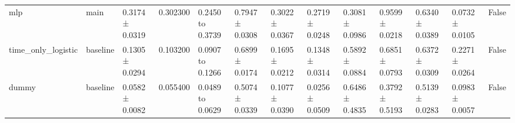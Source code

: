 \begin{tabular}{lllrllllllllr}
mlp & main & 0.3174 ± 0.0319 & 0.302300 & 0.2450 to 0.3739 & 0.7947 ± 0.0308 & 0.3022 ± 0.0367 & 0.2719 ± 0.0248 & 0.3081 ± 0.0986 & 0.9599 ± 0.0218 & 0.6340 ± 0.0389 & 0.0732 ± 0.0105 & False \\
time\_only\_logistic & baseline & 0.1305 ± 0.0294 & 0.103200 & 0.0907 to 0.1266 & 0.6899 ± 0.0174 & 0.1695 ± 0.0212 & 0.1348 ± 0.0314 & 0.5892 ± 0.0884 & 0.6851 ± 0.0793 & 0.6372 ± 0.0309 & 0.2271 ± 0.0264 & False \\
dummy & baseline & 0.0582 ± 0.0082 & 0.055400 & 0.0489 to 0.0629 & 0.5074 ± 0.0339 & 0.1077 ± 0.0390 & 0.0256 ± 0.0509 & 0.6486 ± 0.4835 & 0.3792 ± 0.5193 & 0.5139 ± 0.0283 & 0.0983 ± 0.0057 & False \\
\bottomrule
\end{tabular}
